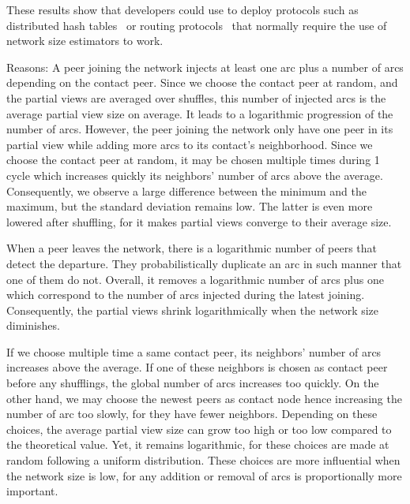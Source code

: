 \begin{asparadesc}
  These results show that developers could use \SPRAY to deploy protocols such
  as distributed hash tables~\cite{camarillo2014self} or routing
  protocols~\cite{kleinberg2000smallworld} that normally require the use of
  network size estimators to work.

\item [Reasons:] A peer joining the network injects at least one arc plus a
  number of arcs depending on the contact peer. Since we choose the contact peer
  at random, and the partial views are averaged over shuffles, this number of
  injected arcs is the average partial view size on average. It leads to a
  logarithmic progression of the number of arcs. However, the peer joining the
  network only have one peer in its partial view while adding more arcs to its
  contact's neighborhood. Since we choose the contact peer at random, it may be
  chosen multiple times during 1 cycle which increases quickly its neighbors'
  number of arcs above the average. Consequently, we observe a large difference
  between the minimum and the maximum, but the standard deviation remains
  low. The latter is even more lowered after shuffling, for it makes partial
  views converge to their average size. 

  When a peer leaves the network, there is a logarithmic number of peers that
  detect the departure. They probabilistically duplicate an arc in such manner
  that one of them do not. Overall, it removes a logarithmic number of arcs plus
  one which correspond to the number of arcs injected during the latest
  joining. Consequently, the partial views shrink logarithmically when the
  network size diminishes.

  If we choose multiple time a same contact peer, its neighbors' number of arcs
  increases above the average. If one of these neighbors is chosen as contact
  peer before any shufflings, the global number of arcs increases too
  quickly. On the other hand, we may choose the newest peers as contact node
  hence increasing the number of arc too slowly, for they have fewer
  neighbors. Depending on these choices, the average partial view size can grow
  too high or too low compared to the theoretical value. Yet, it remains
  logarithmic, for these choices are made at random following a uniform
  distribution. These choices are more influential when the network size is low,
  for any addition or removal of arcs is proportionally more important.
\end{asparadesc}


